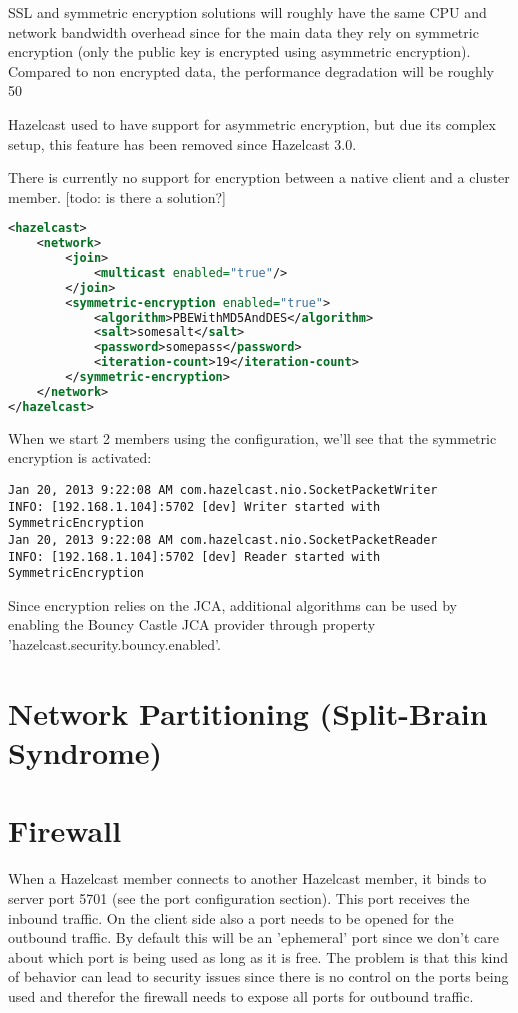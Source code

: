 SSL and symmetric encryption solutions will roughly have the same CPU and network bandwidth overhead since for the main data  they rely on symmetric encryption (only the public key is encrypted using asymmetric encryption). Compared to non encrypted data, the performance degradation will be roughly 50%

Hazelcast used to have support for asymmetric encryption, but due its complex setup, this feature has been removed since Hazelcast 3.0. 

There is currently no support for encryption between a native client and a cluster member. [todo: is there a solution?]

\begin{lstlisting}[language=xml]
<hazelcast>
    <network>
        <join>
            <multicast enabled="true"/>
        </join>
        <symmetric-encryption enabled="true">
            <algorithm>PBEWithMD5AndDES</algorithm>
            <salt>somesalt</salt>
            <password>somepass</password>
            <iteration-count>19</iteration-count>
        </symmetric-encryption>
    </network>
</hazelcast>
\end{lstlisting}
When we start 2 members using the configuration, we'll see that the symmetric encryption is activated:
\begin{lstlisting}
Jan 20, 2013 9:22:08 AM com.hazelcast.nio.SocketPacketWriter
INFO: [192.168.1.104]:5702 [dev] Writer started with SymmetricEncryption
Jan 20, 2013 9:22:08 AM com.hazelcast.nio.SocketPacketReader
INFO: [192.168.1.104]:5702 [dev] Reader started with SymmetricEncryption
\end{lstlisting}
Since encryption relies on the JCA, additional algorithms can be used by enabling the Bouncy Castle JCA provider through property 'hazelcast.security.bouncy.enabled'.

\section{Network Partitioning (Split-Brain Syndrome)}

\section{Firewall}
When a Hazelcast member connects to another Hazelcast member, it binds to server port 5701 (see the port configuration section). This port receives the inbound traffic. On the client side also a port needs to be opened for the outbound traffic. By default this will be an 'ephemeral' port since we don't care about which port is being used as long as it is free. The problem is that this kind of behavior can lead to security issues since there is no control on the ports being used and therefor the firewall needs to expose all ports for outbound traffic. 

